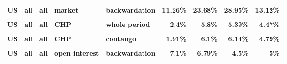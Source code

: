 \documentclass[
  authoryear,
  preprint,
  3p]{elsarticle}
\begin{document}
\begin{landscape}
\begin{longtable}[t]{>{}l>{}l>{}l>{}l>{}l>{}r>{}r>{}r>{}r}
\textbf{US} & \textbf{all} & \textbf{all} & \textbf{market} & \textbf{backwardation} & \textcolor[HTML]{4285f4}{\textbf{11.26\%}} & \textcolor[HTML]{4285f4}{\textbf{23.68\%}} & \textcolor[HTML]{4285f4}{\textbf{28.95\%}} & \textcolor[HTML]{4285f4}{\textbf{13.12\%}}\\
\textbf{\cellcolor{gray!10}{US}} & \textbf{\cellcolor{gray!10}{all}} & \textbf{\cellcolor{gray!10}{all}} & \textbf{\cellcolor{gray!10}{market}} & \textbf{\cellcolor{gray!10}{contango}} & \textcolor[HTML]{4285f4}{\textbf{\cellcolor{gray!10}{12.22\%}}} & \textcolor[HTML]{4285f4}{\textbf{\cellcolor{gray!10}{19.97\%}}} & \textcolor[HTML]{4285f4}{\textbf{\cellcolor{gray!10}{32.48\%}}} & \textcolor[HTML]{4285f4}{\textbf{\cellcolor{gray!10}{17.66\%}}}\\
\addlinespace
\textbf{US} & \textbf{all} & \textbf{all} & \textbf{CHP} & \textbf{whole period} & \textcolor[HTML]{4285f4}{\textbf{2.4\%}} & \textcolor[HTML]{4285f4}{\textbf{5.8\%}} & \textcolor[HTML]{4285f4}{\textbf{5.39\%}} & \textcolor[HTML]{4285f4}{\textbf{4.47\%}}\\
\textbf{\cellcolor{gray!10}{US}} & \textbf{\cellcolor{gray!10}{all}} & \textbf{\cellcolor{gray!10}{all}} & \textbf{\cellcolor{gray!10}{CHP}} & \textbf{\cellcolor{gray!10}{backwardation}} & \textcolor[HTML]{4285f4}{\textbf{\cellcolor{gray!10}{3.19\%}}} & \textcolor[HTML]{4285f4}{\textbf{\cellcolor{gray!10}{5.94\%}}} & \textcolor[HTML]{4285f4}{\textbf{\cellcolor{gray!10}{4.72\%}}} & \textcolor[HTML]{4285f4}{\textbf{\cellcolor{gray!10}{5.54\%}}}\\
\textbf{US} & \textbf{all} & \textbf{all} & \textbf{CHP} & \textbf{contango} & \textcolor[HTML]{4285f4}{\textbf{1.91\%}} & \textcolor[HTML]{4285f4}{\textbf{6.1\%}} & \textcolor[HTML]{4285f4}{\textbf{6.14\%}} & \textcolor[HTML]{4285f4}{\textbf{4.79\%}}\\
\textbf{\cellcolor{gray!10}{US}} & \textbf{\cellcolor{gray!10}{all}} & \textbf{\cellcolor{gray!10}{all}} & \textbf{\cellcolor{gray!10}{open interest}} & \textbf{\cellcolor{gray!10}{whole period}} & \textcolor[HTML]{4285f4}{\textbf{\cellcolor{gray!10}{7.45\%}}} & \textcolor[HTML]{4285f4}{\textbf{\cellcolor{gray!10}{6.95\%}}} & \textcolor[HTML]{4285f4}{\textbf{\cellcolor{gray!10}{4.57\%}}} & \textcolor[HTML]{4285f4}{\textbf{\cellcolor{gray!10}{5.29\%}}}\\
\textbf{US} & \textbf{all} & \textbf{all} & \textbf{open interest} & \textbf{backwardation} & \textcolor[HTML]{4285f4}{\textbf{7.1\%}} & \textcolor[HTML]{4285f4}{\textbf{6.79\%}} & \textcolor[HTML]{4285f4}{\textbf{4.5\%}} & \textcolor[HTML]{4285f4}{\textbf{5\%}}\\

\end{longtable}
\end{landscape}
\end{document}
